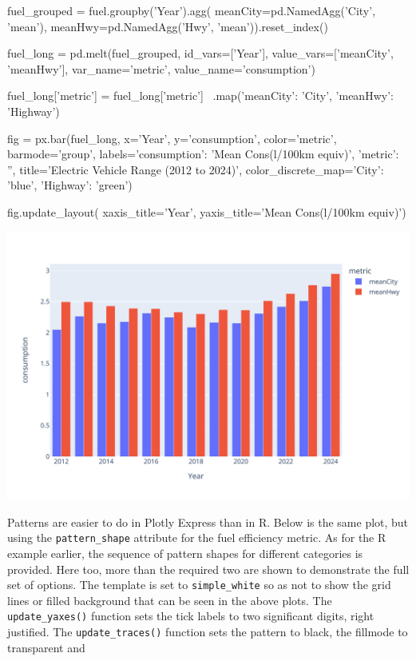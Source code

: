 \begin{samepage}
\begin{pythoncode}
fuel_grouped = fuel.groupby('Year').agg(
       meanCity=pd.NamedAgg('City', 'mean'),
       meanHwy=pd.NamedAgg('Hwy', 'mean')).reset_index()

fuel_long = pd.melt(fuel_grouped, 
                id_vars=['Year'], 
                value_vars=['meanCity', 'meanHwy'], 
                var_name='metric', 
                value_name='consumption')

fuel_long['metric'] = fuel_long['metric'] \
       .map({'meanCity': 'City', 'meanHwy': 'Highway'})

fig = px.bar(fuel_long, x='Year', y='consumption', 
   color='metric', barmode='group',
   labels={'consumption': 'Mean Cons\n(l/100km equiv)', 'metric': ''},
   title='Electric Vehicle Range (2012 to 2024)',
   color_discrete_map={'City': 'blue', 'Highway': 'green'})

fig.update_layout(
    xaxis_title='Year', 
    yaxis_title='Mean Cons\n(l/100km equiv)')
\end{pythoncode}
\end{samepage}

\begin{center}
  \includegraphics[width=.8\textwidth]{px.fuel.columns.pdf}
\end{center}

Patterns are easier to do in Plotly Express than in R. Below is the same plot, but using the \texttt{pattern\_shape} attribute for the fuel efficiency metric. As for the R example earlier, the sequence of pattern shapes for different categories is provided. Here too, more than the required two are shown to demonstrate the full set of options. The template is set to \texttt{simple\_white} so as not to show the grid lines or filled background that can be seen in the above plots. The \texttt{update\_yaxes()} function sets the tick labels to two significant digits, right justified. The \texttt{update\_traces()} function sets the pattern to black, the fillmode to transparent and 

